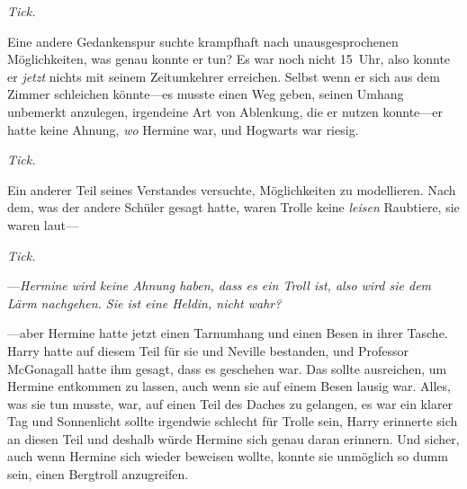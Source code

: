 \emph{Tick.}

Eine andere Gedankenspur suchte krampfhaft nach unausgesprochenen Möglichkeiten, was genau konnte er tun? Es war noch nicht 15~Uhr, also konnte er \emph{jetzt} nichts mit seinem Zeitumkehrer erreichen. Selbst wenn er sich aus dem Zimmer schleichen könnte—es musste einen Weg geben, seinen Umhang unbemerkt anzulegen, irgendeine Art von Ablenkung, die er nutzen konnte—er hatte keine Ahnung, \emph{wo} Hermine war, und Hogwarts war riesig.

\emph{Tick.}

Ein anderer Teil seines Verstandes versuchte, Möglichkeiten zu modellieren. Nach dem, was der andere Schüler gesagt hatte, waren Trolle keine \emph{leisen} Raubtiere, sie waren laut—

\emph{Tick.}


—\emph{Hermine wird keine Ahnung haben, dass es ein Troll ist, also wird sie dem Lärm nachgehen. Sie ist eine Heldin, nicht wahr?}

—aber Hermine hatte jetzt einen Tarnumhang und einen Besen in ihrer Tasche. Harry hatte auf diesem Teil für sie und Neville bestanden, und Professor McGonagall hatte ihm gesagt, dass es geschehen war. Das sollte ausreichen, um Hermine entkommen zu lassen, auch wenn sie auf einem Besen lausig war. Alles, was sie tun musste, war, auf einen Teil des Daches zu gelangen, es war ein klarer Tag und Sonnenlicht sollte irgendwie schlecht für Trolle sein, Harry erinnerte sich an diesen Teil und deshalb würde Hermine sich genau daran erinnern. Und sicher, auch wenn Hermine sich wieder beweisen wollte, konnte sie unmöglich so dumm sein, einen Bergtroll anzugreifen.

